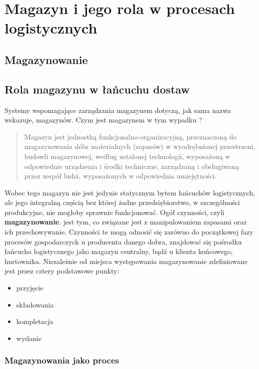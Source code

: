 \chapter{Magazyn i jego rola w procesach logistycznych}
\label{c4:c4}

\section{Magazynowanie}

\section{Rola magazynu w łańcuchu dostaw}

	Systemy wspomagające zarządzania magazynem dotyczą, jak sama nazwa wskazuje, magazynów.
	Czym jest magazynem w tym wypadku ?
	\begin{quotation}
		Magazyn jest jednostką funkcjonalno-organizacyjną, przeznaczoną do magazynowania
		dóbr materialnych (zapasów) w wyodrębnionej przestrzeni, budowli magazynowej, według ustalonej
		technologii, wyposażoną w odpowiednie urządzenia i środki techniczne, zarządzaną i obsługiwaną
		przez zespół ludzi, wyposażonych w odpowiednia umiejętności.
	\end{quotation}
	
	Wobec tego magazyn nie jest jedynie statycznym bytem łańcuchów logistycznych, ale jego integralną
	częścią bez której żadne przedsiębiorstwo, w szczególności produkcyjne, nie mogłoby sprawnie
	funkcjonować. Ogół czynności, czyli \textbf{magazynowanie}. jest tym, co związane jest z manipulowaniem
	zapasami oraz ich przechowywanie. Czynności te mogą odnosić się zarówno do początkowej fazy procesów gospodarczych
	u producenta danego dobra, znajdować się pośrodku łańcucha logistycznego jako magazyn centralny, bądź u klienta
	końcowego, hurtownika. Niezależnie od miejsca występowania magazynowanie zdefiniowane jest przez cztery
	podstawowe punkty: 
	\begin{itemize}
		\item przyjęcie
		\item składowania
		\item kompletacja
		\item wydanie
	\end{itemize}
	\cite{PZMW}\cite{PL_FM}
	
	\subsection{Magazynowania jako proces}

